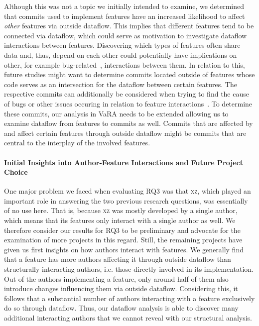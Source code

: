 Although this was not a topic we initially intended to examine, we determined that commits used to implement features have an increased likelihood to affect \emph{other} features via outside dataflow.
This implies that different features tend to be connected via dataflow, which could serve as motivation to investigate dataflow interactions between features.
Discovering which types of features often share data and, thus, depend on each other could potentially have implications on other, for example bug-related~\cite{nie2011survey}, interactions between them.
In relation to this, future studies might want to determine commits located outside of features whose code serves as an intersection for the dataflow between certain features.
The respective commits can additionally be considered when trying to find the cause of bugs or other issues occuring in relation to feature interactions~\cite{apel2014feature}.
To determine these commits, our analysis in VaRA needs to be extended allowing us to examine dataflow from features to commits as well.
Commits that are affected by and affect certain features through outside dataflow might be commits that are central to the interplay of the involved features. 

\paragraph{Initial Insights into Author-Feature Interactions and Future Project Choice}
One major problem we faced when evaluating RQ3 was that \textsc{xz}, which played an important role in answering the two previous research questions, was essentially of no use here.
That is, because \textsc{xz} was mostly developed by a single author, which means that its features only interact with a single author as well.
We therefore consider our results for RQ3 to be preliminary and advocate for the examination of more projects in this regard.
Still, the remaining projects have given us first insights on how authors interact with features.
We generally find that a feature has more authors affecting it through outside dataflow than structurally interacting authors, i.e. those directly involved in its implementation.
Out of the authors implementing a feature, only around half of them also introduce changes influencing them via outside dataflow.
Considering this, it follows that a substantial number of authors interacting with a feature exclusively do so through dataflow.
Thus, our dataflow analysis is able to discover many additional interacting authors that we cannot reveal with our structural analysis.

